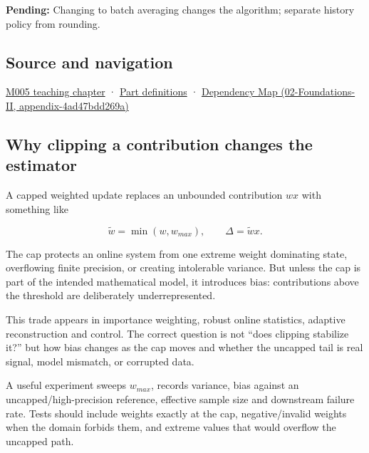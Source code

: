 \textbf{Pending:} Changing to batch averaging changes the algorithm; separate history policy from rounding.

\subsection{Source and navigation}\label{appendix-1e45d0613db3-source-and-navigation}

\hyperref[01-foundations-i-ch001-when-arithmetic-meets-uncertainty]{M005 teaching chapter} · \hyperref[appendix-fd090d982a15-m005---parts-77-88]{Part definitions} · \href{../02-Foundations-II/main.pdf\#nameddest=appendix-4ad47bdd269a}{Dependency Map (02-Foundations-II, appendix-4ad47bdd269a)}

\subsection{Why clipping a contribution changes the estimator}\label{appendix-1e45d0613db3-why-clipping-a-contribution-changes-the-estimator}

A capped weighted update replaces an unbounded contribution \(w x\) with something like

\[
\tilde w = \min(w,w_{max}),
\qquad
\Delta = \tilde w x.
\]

The cap protects an online system from one extreme weight dominating state, overflowing finite precision, or creating intolerable variance. But unless the cap is part of the intended mathematical model, it introduces bias: contributions above the threshold are deliberately underrepresented.

This trade appears in importance weighting, robust online statistics, adaptive reconstruction and control. The correct question is not ``does clipping stabilize it?'' but how bias changes as the cap moves and whether the uncapped tail is real signal, model mismatch, or corrupted data.

A useful experiment sweeps \(w_{max}\), records variance, bias against an uncapped/high-precision reference, effective sample size and downstream failure rate. Tests should include weights exactly at the cap, negative/invalid weights when the domain forbids them, and extreme values that would overflow the uncapped path.
